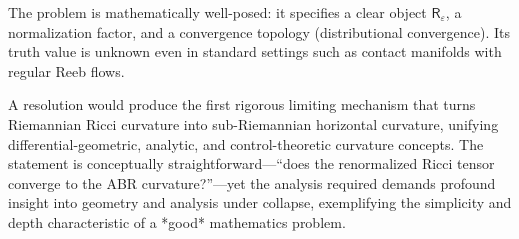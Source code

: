 The problem is mathematically well-posed: it specifies a clear object \(\mathsf{R}_\varepsilon\), a normalization factor, and a convergence topology (distributional convergence). Its truth value is unknown even in standard settings such as contact manifolds with regular Reeb flows.  

A resolution would produce the first rigorous limiting mechanism that turns Riemannian Ricci curvature into sub-Riemannian horizontal curvature, unifying differential-geometric, analytic, and control-theoretic curvature concepts. The statement is conceptually straightforward—“does the renormalized Ricci tensor converge to the ABR curvature?”—yet the analysis required demands profound insight into geometry and analysis under collapse, exemplifying the simplicity and depth characteristic of a *good* mathematics problem.